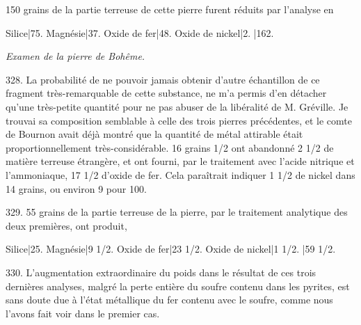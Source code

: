 \documentclass[a4paper, 11pt, oneside, polutonikogreek, french]{article}
\begin{document}
150 grains de la partie terreuse de cette pierre furent réduits par l'analyse en

Silice|75.
Magnésie|37.
Oxide de fer|48.
Oxide de nickel|2.
|162.

\emph{Examen de la pierre de Bohême.}

328. La probabilité de ne pouvoir jamais obtenir d'autre échantillon de ce fragment très-remarquable de cette substance, ne m'a permis d'en détacher qu'une très-petite quantité pour ne pas abuser de la libéralité de M. Gréville. Je trouvai sa composition semblable à celle des trois pierres précédentes, et le comte de Bournon avait déjà montré que la quantité de métal attirable était proportionnellement très-considérable. 16 grains 1/2 ont abandonné 2 1/2 de matière terreuse étrangère, et ont fourni, par le traitement avec l'acide nitrique et l'ammoniaque, 17 1/2 d'oxide de fer. Cela paraîtrait indiquer 1 1/2 de nickel dans 14 grains, ou environ 9 pour 100.

329. 55 grains de la partie terreuse de la pierre, par le traitement analytique des deux premières, ont produit,

Silice|25.
Magnésie|9 1/2.
Oxide de fer|23 1/2.
Oxide de nickel|1 1/2.
|59 1/2.

330. L'augmentation extraordinaire du poids dans le résultat de ces trois dernières analyses, malgré la perte entière du soufre contenu dans les pyrites, est sans doute due à l'état métallique du fer contenu avec le soufre, comme nous l'avons fait voir dans le premier cas.
\end{document}
